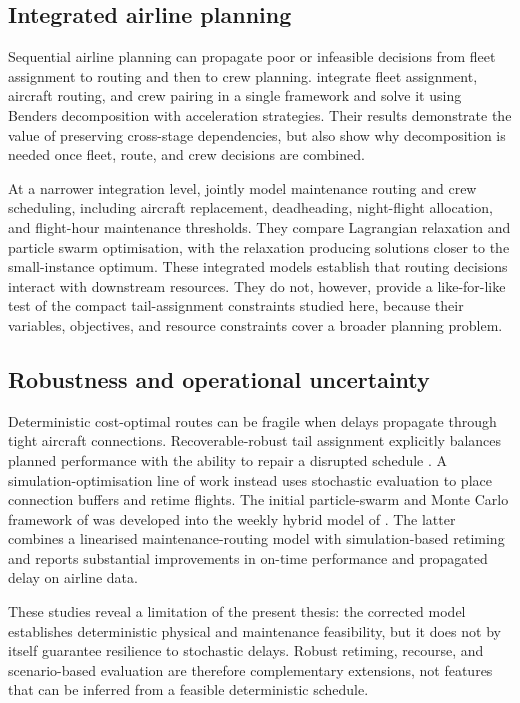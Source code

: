 \subsection{Integrated airline planning}

Sequential airline planning can propagate poor or infeasible decisions from
fleet assignment to routing and then to crew planning. \citet{shao2017integrated}
integrate fleet assignment, aircraft routing, and crew pairing in a single
framework and solve it using Benders decomposition with acceleration
strategies. Their results demonstrate the value of preserving cross-stage
dependencies, but also show why decomposition is needed once fleet, route, and
crew decisions are combined.

At a narrower integration level, \citet{mirjafari2020integrated} jointly model
maintenance routing and crew scheduling, including aircraft replacement,
deadheading, night-flight allocation, and flight-hour maintenance thresholds.
They compare Lagrangian relaxation and particle swarm optimisation, with the
relaxation producing solutions closer to the small-instance optimum. These
integrated models establish that routing decisions interact with downstream
resources. They do not, however, provide a like-for-like test of the compact
tail-assignment constraints studied here, because their variables, objectives,
and resource constraints cover a broader planning problem.

\subsection{Robustness and operational uncertainty}

Deterministic cost-optimal routes can be fragile when delays propagate through
tight aircraft connections. Recoverable-robust tail assignment explicitly
balances planned performance with the ability to repair a disrupted schedule
\citep{froyland2013recoverable}. A simulation-optimisation line of work instead
uses stochastic evaluation to place connection buffers and retime flights. The
initial particle-swarm and Monte Carlo framework of
\citet{benahmed2015simulation} was developed into the weekly hybrid model of
\citet{benahmed2017hybrid}. The latter combines a linearised maintenance-routing
model with simulation-based retiming and reports substantial improvements in
on-time performance and propagated delay on airline data.

These studies reveal a limitation of the present thesis: the corrected model
establishes deterministic physical and maintenance feasibility, but it does not
by itself guarantee resilience to stochastic delays. Robust retiming, recourse,
and scenario-based evaluation are therefore complementary extensions, not
features that can be inferred from a feasible deterministic schedule.

